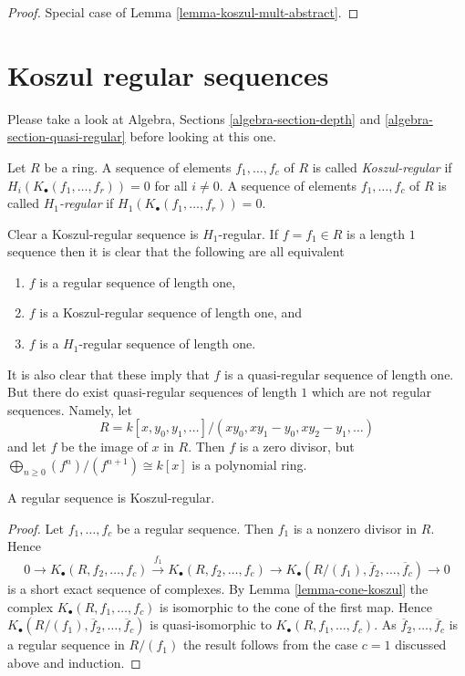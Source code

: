 \begin{proof}
Special case of
Lemma \ref{lemma-koszul-mult-abstract}.
\end{proof}





\section{Koszul regular sequences}
\label{section-koszul-regular}

\noindent
Please take a look at
Algebra, Sections \ref{algebra-section-depth} and
\ref{algebra-section-quasi-regular}
before looking at this one.

\begin{definition}
\label{definition-koszul-regular-sequence}
Let $R$ be a ring.
A sequence of elements $f_1, \ldots, f_c$ of $R$ is called
{\it Koszul-regular} if $H_i(K_\bullet(f_1, \ldots, f_r)) = 0$ for
all $i \not = 0$.
A sequence of elements $f_1, \ldots, f_c$ of $R$ is called
{\it $H_1$-regular} if $H_1(K_\bullet(f_1, \ldots, f_r)) = 0$.
\end{definition}

\noindent
Clear a Koszul-regular sequence is $H_1$-regular. If $f = f_1 \in R$
is a length $1$ sequence then it is clear that the following are
all equivalent
\begin{enumerate}
\item $f$ is a regular sequence of length one,
\item $f$ is a Koszul-regular sequence of length one, and
\item $f$ is a $H_1$-regular sequence of length one.
\end{enumerate}
It is also clear that these imply that $f$ is a quasi-regular sequence
of length one. But there do exist quasi-regular sequences of length $1$
which are not regular sequences. Namely, let
$$
R = k[x, y_0, y_1, \ldots]/(xy_0, xy_1 - y_0, xy_2 - y_1, \ldots)
$$
and let $f$ be the image of $x$ in $R$. Then $f$ is a zero divisor, but
$\bigoplus_{n \geq 0} (f^n)/(f^{n + 1}) \cong k[x]$ is a polynomial ring.

\begin{lemma}
\label{lemma-regular-koszul-regular}
A regular sequence is Koszul-regular.
\end{lemma}

\begin{proof}
Let $f_1, \ldots, f_c$ be a regular sequence. Then $f_1$ is a nonzero
divisor in $R$. Hence
$$
0 \to K_\bullet(R, f_2, \ldots, f_c) \xrightarrow{f_1}
K_\bullet(R, f_2, \ldots, f_c) \to
K_\bullet(R/(f_1), \overline{f}_2, \ldots, \overline{f}_c) \to 0
$$
is a short exact sequence of complexes. By
Lemma \ref{lemma-cone-koszul}
the complex $K_\bullet(R, f_1, \ldots, f_c)$
is isomorphic to the cone of the first map. Hence
$K_\bullet(R/(f_1), \overline{f}_2, \ldots, \overline{f}_c)$
is quasi-isomorphic to $K_\bullet(R, f_1, \ldots, f_c)$.
As $\overline{f}_2, \ldots, \overline{f}_c$ is a regular sequence
in $R/(f_1)$ the result follows from the case $c = 1$ discussed above and
induction.
\end{proof}

